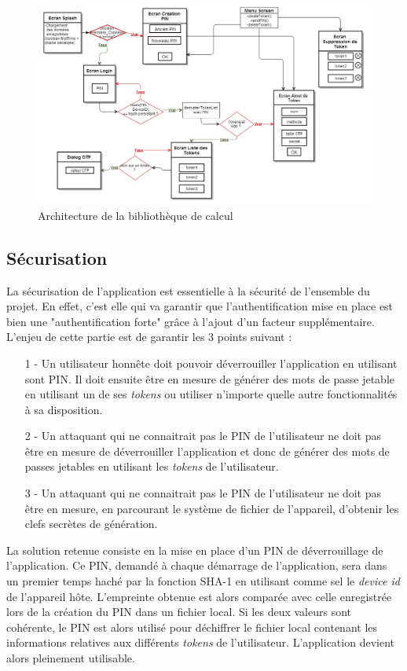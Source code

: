\begin{figure}
  \centering
  \includegraphics[scale=0.4]{../graphics/archi-android.jpg}
  \caption{Architecture de la bibliothèque de calcul}
  \label{fig:umlLib}
\end{figure}

\subsection{Sécurisation}
\label{secu}
La sécurisation de l'application est essentielle à la sécurité de l'ensemble du projet. En
effet, c'est elle qui va garantir que l'authentification mise en place est bien une
"authentification forte" grâce à l'ajout d'un facteur supplémentaire. L'enjeu de cette
partie est de garantir les 3 points suivant :


\begin{itemize}
  \item[1 -] Un utilisateur honnête doit pouvoir déverrouiller l'application en utilisant
  sont PIN. Il doit ensuite être en mesure de générer des mots de passe jetable en utilisant
  un de ses \emph{tokens} ou utiliser n'importe quelle autre fonctionnalités à sa
  disposition.
  \item[2 -] Un attaquant qui ne connaitrait pas le PIN de l'utilisateur ne doit pas être en
  mesure de déverrouiller l'application et donc de générer des mots de passes jetables en
  utilisant les \emph{tokens} de l'utilisateur.
  \item[3 -] Un attaquant qui ne connaitrait pas le PIN de l'utilisateur ne doit pas être en
  mesure, en parcourant le système de fichier de l'appareil, d'obtenir les clefs secrètes
  de génération.
\end{itemize}

La solution retenue consiste en la mise en place d'un PIN de déverrouillage de l'application.
Ce PIN, demandé à chaque démarrage de l'application, sera dans un premier temps haché par la
fonction SHA-1 en utilisant comme sel le \emph{device id} de l'appareil hôte. L'empreinte
obtenue est alors comparée avec celle enregistrée lors de la création du PIN dans un fichier
local. Si les deux valeurs sont cohérente, le PIN est alors utilisé pour déchiffrer le
fichier local contenant les informations relatives aux différents \emph{tokens} de
l'utilisateur. L'application devient alors pleinement utilisable.

